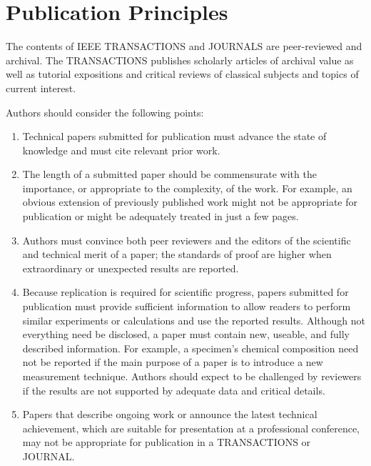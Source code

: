 \section{Publication Principles}
The contents of IEEE TRANSACTIONS and JOURNALS are peer-reviewed and 
archival. The TRANSACTIONS publishes scholarly articles of archival value as 
well as tutorial expositions and critical reviews of classical subjects and 
topics of current interest. 

Authors should consider the following points:

\begin{enumerate}
\item Technical papers submitted for publication must advance the state of knowledge and must cite relevant prior work. 
\item The length of a submitted paper should be commensurate with the importance, or appropriate to the complexity, of the work. For example, an obvious extension of previously published work might not be appropriate for publication or might be adequately treated in just a few pages.
\item Authors must convince both peer reviewers and the editors of the scientific and technical merit of a paper; the standards of proof are higher when extraordinary or unexpected results are reported. 
\item Because replication is required for scientific progress, papers submitted for publication must provide sufficient information to allow readers to perform similar experiments or calculations and use the reported results. Although not everything need be disclosed, a paper must contain new, useable, and fully described information. For example, a specimen's chemical composition need not be reported if the main purpose of a paper is to introduce a new measurement technique. Authors should expect to be challenged by reviewers if the results are not supported by adequate data and critical details.
\item Papers that describe ongoing work or announce the latest technical achievement, which are suitable for presentation at a professional conference, may not be appropriate for publication in a TRANSACTIONS or JOURNAL.
\end{enumerate}
